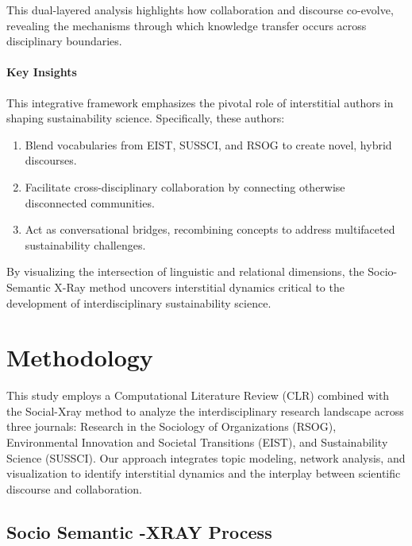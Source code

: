 \documentclass[12pt]{article}
\begin{document}
This dual-layered analysis highlights how collaboration and discourse co-evolve, revealing the mechanisms through which knowledge transfer occurs across disciplinary boundaries.

\paragraph{Key Insights}
This integrative framework emphasizes the pivotal role of interstitial authors in shaping sustainability science. Specifically, these authors:
\begin{enumerate}
    \item Blend vocabularies from EIST, SUSSCI, and RSOG to create novel, hybrid discourses.
    \item Facilitate cross-disciplinary collaboration by connecting otherwise disconnected communities.
    \item Act as conversational bridges, recombining concepts to address multifaceted sustainability challenges.
\end{enumerate}

By visualizing the intersection of linguistic and relational dimensions, the Socio-Semantic X-Ray method uncovers interstitial dynamics critical to the development of interdisciplinary sustainability science.


\section{Methodology}
\label{sec:methodology}

This study employs a Computational Literature Review (CLR) combined with the Social-Xray method to analyze the interdisciplinary research landscape across three journals: Research in the Sociology of Organizations (RSOG), Environmental Innovation and Societal Transitions (EIST), and Sustainability Science (SUSSCI). Our approach integrates topic modeling, network analysis, and visualization to identify interstitial dynamics and the interplay between scientific discourse and collaboration.



\subsection{Socio Semantic -XRAY Process}
\label{sec:social_xray}
\end{document}
